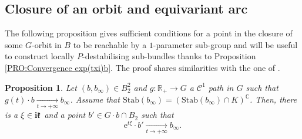 \documentclass{article}
\newtheorem{proposition}[theorem]{Proposition}
\theoremstyle{remark}
\theoremstyle{definition}
\newcommand{\R}{\mathbb{R}}
\newcommand{\C}{\mathbb{C}}
\newcommand{\tend}[2]{\underset{#1 \rightarrow #2}{\longrightarrow}}
\newcommand{\Stab}{\mathrm{Stab}}
\renewcommand{\i}{\boldsymbol{\mathrm{i}}}
\newcommand{\e}{\boldsymbol{\mathrm{e}}}
\newcommand{\mC}{\mathcal{C}}
\begin{document}
\subsection{Closure of an orbit and equivariant arc}\label{SEC:Arc équivariant semi-stable}

The following proposition gives sufficient conditions for a point in the closure of some $G$-orbit in $B$ to be reachable by a $1$-parameter sub-group and will be useful to construct locally $P$-destabilising sub-bundles thanks to Proposition \ref{PRO:Convergence exp(txi)b}. The proof shares similarities with the one of \cite[Theorem 12.5]{GRS}.

\begin{proposition}\label{PRO:Existence arc équivariant semi-stable}
    Let $(b,b_\infty) \in B_2^2$ and $g : \R_+ \rightarrow G$ a $\mC^1$ path in $G$ such that $g(t) \cdot b \tend{t}{+\infty} b_\infty$. Assume that $\Stab(b_\infty) = (\Stab(b_\infty) \cap K)^\C$. Then, there is a $\xi \in \i\frak{k}$ and a point $b' \in G \cdot b \cap B_2$ such that
    $$
    \e^{t\xi} \cdot b' \tend{t}{+\infty} b_\infty.
    $$
\end{proposition}
\end{document}
